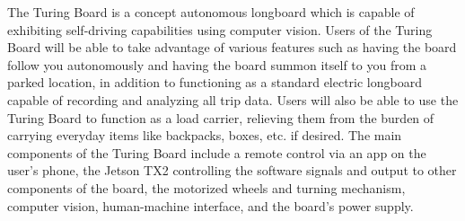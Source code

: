 The Turing Board is a concept autonomous longboard which is capable of exhibiting self-driving capabilities using computer vision. Users of the Turing Board will be able to take advantage of various features such as having the board follow you autonomously and having the board summon itself to you from a parked location, in addition to functioning as a standard electric longboard capable of recording and analyzing all trip data. Users will also be able to use the Turing Board to function as a load carrier, relieving them from the burden of carrying everyday items like backpacks, boxes, etc. if desired. 
The main components of the Turing Board include a remote control via an app on the user's phone, the Jetson TX2 controlling the software signals and output to other components of the board, the motorized wheels and turning mechanism, computer vision, human-machine interface, and the board's power supply. 

